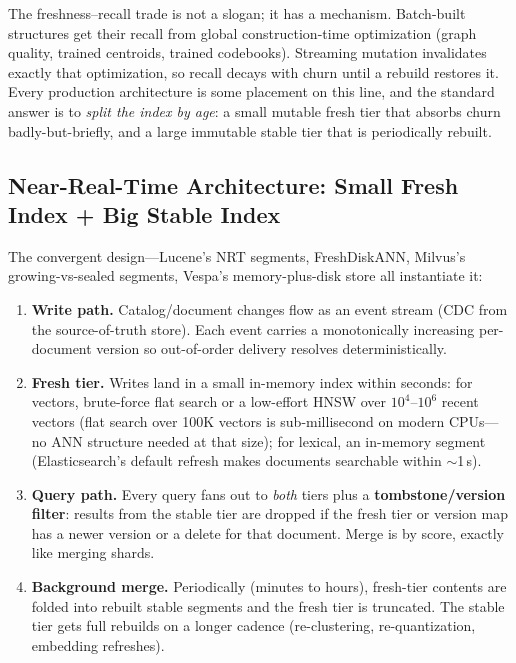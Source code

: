 \begin{keyinsight}
The freshness--recall trade is not a slogan; it has a mechanism. Batch-built structures get their recall from global construction-time optimization (graph quality, trained centroids, trained codebooks). Streaming mutation invalidates exactly that optimization, so recall decays with churn until a rebuild restores it. Every production architecture is some placement on this line, and the standard answer is to \textit{split the index by age}: a small mutable fresh tier that absorbs churn badly-but-briefly, and a large immutable stable tier that is periodically rebuilt.
\end{keyinsight}

\subsection{Near-Real-Time Architecture: Small Fresh Index + Big Stable Index}

The convergent design---Lucene's NRT segments, FreshDiskANN, Milvus's growing-vs-sealed segments, Vespa's memory-plus-disk store all instantiate it:

\begin{enumerate}
    \item \textbf{Write path.} Catalog/document changes flow as an event stream (CDC from the source-of-truth store). Each event carries a monotonically increasing per-document version so out-of-order delivery resolves deterministically.
    \item \textbf{Fresh tier.} Writes land in a small in-memory index within seconds: for vectors, brute-force flat search or a low-effort HNSW over $10^4$--$10^6$ recent vectors (flat search over 100K vectors is sub-millisecond on modern CPUs---no ANN structure needed at that size); for lexical, an in-memory segment (Elasticsearch's default refresh makes documents searchable within $\sim$1\,s).
    \item \textbf{Query path.} Every query fans out to \textit{both} tiers plus a \textbf{tombstone/version filter}: results from the stable tier are dropped if the fresh tier or version map has a newer version or a delete for that document. Merge is by score, exactly like merging shards.
    \item \textbf{Background merge.} Periodically (minutes to hours), fresh-tier contents are folded into rebuilt stable segments and the fresh tier is truncated. The stable tier gets full rebuilds on a longer cadence (re-clustering, re-quantization, embedding refreshes).
\end{enumerate}

